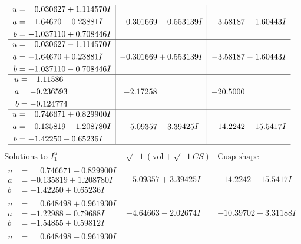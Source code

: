\documentclass[1p]{elsarticle_modified}
\theoremstyle{definition}
\newcommand{\I}{\sqrt{-1}}
\begin{document}
$$\begin{array}{c|c|c}
\begin{aligned}
u &= \phantom{-}0.030627 + 1.114570 I \\
a &= -1.64670 - 0.23881 I \\
b &= -1.037110 + 0.708446 I\end{aligned}
 & -0.301669 - 0.553139 I & -3.58187 + 1.60443 I \\ \hline\begin{aligned}
u &= \phantom{-}0.030627 - 1.114570 I \\
a &= -1.64670 + 0.23881 I \\
b &= -1.037110 - 0.708446 I\end{aligned}
 & -0.301669 + 0.553139 I & -3.58187 - 1.60443 I \\ \hline\begin{aligned}
u &= -1.11586\phantom{ +0.000000I} \\
a &= -0.236593\phantom{ +0.000000I} \\
b &= -0.124774\phantom{ +0.000000I}\end{aligned}
 & -2.17258\phantom{ +0.000000I} & -20.5000\phantom{ +0.000000I} \\ \hline\begin{aligned}
u &= \phantom{-}0.746671 + 0.829900 I \\
a &= -0.135819 - 1.208780 I \\
b &= -1.42250 - 0.65236 I\end{aligned}
 & -5.09357 - 3.39425 I & -14.2242 + 15.5417 I\\
 \hline 
 \end{array}$$\newpage$$\begin{array}{c|c|c}  
\text{Solutions to }I^u_{1}& \I (\text{vol} + \sqrt{-1}CS) & \text{Cusp shape}\\
 \hline 
\begin{aligned}
u &= \phantom{-}0.746671 - 0.829900 I \\
a &= -0.135819 + 1.208780 I \\
b &= -1.42250 + 0.65236 I\end{aligned}
 & -5.09357 + 3.39425 I & -14.2242 - 15.5417 I \\ \hline\begin{aligned}
u &= \phantom{-}0.648498 + 0.961930 I \\
a &= -1.22988 - 0.79688 I \\
b &= -1.54855 + 0.59812 I\end{aligned}
 & -4.64663 - 2.02674 I & -10.39702 - 3.31188 I \\ \hline\begin{aligned}
u &= \phantom{-}0.648498 - 0.961930 I \\

\end{aligned}
\end{array}$$
\end{document}
